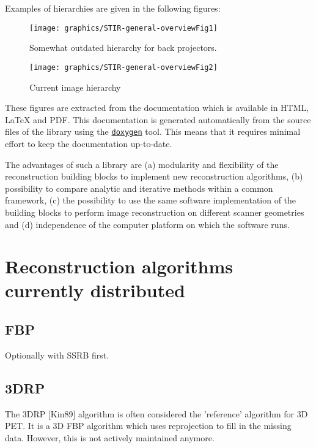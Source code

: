 \documentclass{article}
\def\R2Lurl#1#2{\mbox{\href{#1}{\tt #2}}}
\begin{document}
Examples of hierarchies are given in the following figures:
\begin{figure}[htbp]
\begin{center}
\texttt{[image: graphics/STIR-general-overviewFig1]}
\caption{Somewhat outdated hierarchy for back projectors.}
\end{center}
\end{figure}


\begin{figure}[htbp]
\begin{center}
\texttt{[image: graphics/STIR-general-overviewFig2]}
\caption{Current image hierarchy}
\end{center}
\end{figure}

These figures are extracted from the documentation which is available 
in HTML, LaTeX and PDF. This documentation is generated automatically 
from the source files of the library using the \R2Lurl{http://www.doxygen.org/ }{doxygen} 
tool. This means that it requires minimal effort to keep the 
documentation up-to-date.

The advantages of such a library are (a) modularity and flexibility 
of the reconstruction building blocks to implement new reconstruction 
algorithms, (b) possibility to compare analytic and iterative 
methods within a common framework, (c) the possibility to use 
the same software implementation of the building blocks to perform 
image reconstruction on different scanner geometries and (d) 
independence of the computer platform on which the software runs.



\section{
Reconstruction algorithms currently distributed}

\subsection{FBP}
Optionally with SSRB first.

\subsection{3DRP}
The 3DRP [Kin89] algorithm is often considered the 'reference' 
algorithm for 3D PET. It is a 3D FBP algorithm which uses reprojection 
to fill in the missing data. However, this is not actively maintained anymore.
\end{document}
